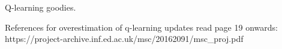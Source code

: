 \documentclass{../main.tex}{subfiles}
\begin{document}
Q-learning goodies.

References for overestimation of q-learning updates read page 19 onwards: https://project-archive.inf.ed.ac.uk/msc/20162091/msc_proj.pdf
\end{document}
